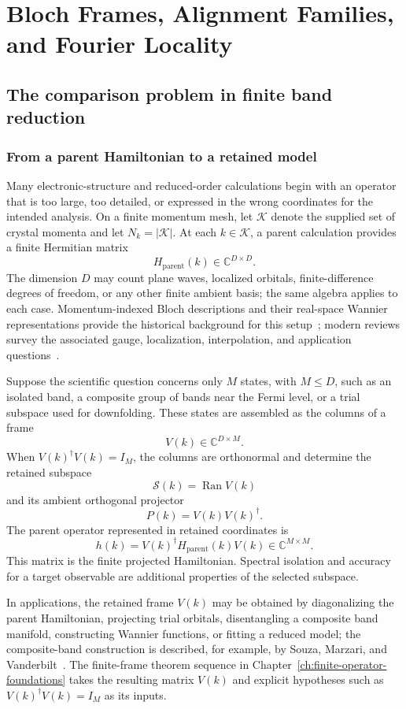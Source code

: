 \chapter{Bloch Frames, Alignment Families, and Fourier Locality}
\label{ch:bloch-alignment-locality}

\section{The comparison problem in finite band reduction}

\subsection{From a parent Hamiltonian to a retained model}

Many electronic-structure and reduced-order calculations begin with an operator that is
too large, too detailed, or expressed in the wrong coordinates for the intended
analysis. On a finite momentum mesh, let $\mathcal K$ denote the supplied set of crystal
momenta and let $N_k=|\mathcal K|$. At each $k\in\mathcal K$, a parent calculation
provides a finite Hermitian matrix
\[
  H_{\mathrm{parent}}(k)\in\mathbb C^{D\times D}.
\]
The dimension $D$ may count plane waves, localized orbitals, finite-difference degrees
of freedom, or any other finite ambient basis; the same algebra applies to each case.
Momentum-indexed Bloch descriptions and their real-space Wannier representations provide
the historical background for this setup~\cite{Bloch1929,Wannier1937}; modern reviews
survey the associated gauge, localization, interpolation, and application
questions~\cite{MarzariEtAl2012}.

Suppose the scientific question concerns only $M$ states, with $M\leq D$, such as an
isolated band, a composite group of bands near the Fermi level, or a trial subspace used
for downfolding. These states are assembled as the columns of a frame
\[
  V(k)\in\mathbb C^{D\times M}.
\]
When $V(k)^\dagger V(k)=I_M$, the columns are orthonormal and determine the retained
subspace
\[
  \mathcal S(k)=\operatorname{Ran}V(k)
\]
and its ambient orthogonal projector
\[
  P(k)=V(k)V(k)^\dagger.
\]
The parent operator represented in retained coordinates is
\[
  h(k)=V(k)^\dagger H_{\mathrm{parent}}(k)V(k)
  \in\mathbb C^{M\times M}.
\]
This matrix is the finite projected Hamiltonian. Spectral isolation and accuracy for a
target observable are additional properties of the selected subspace.

In applications, the retained frame $V(k)$ may be obtained by diagonalizing the parent
Hamiltonian, projecting trial orbitals, disentangling a composite band manifold,
constructing Wannier functions, or fitting a reduced model; the composite-band
construction is described, for example, by Souza, Marzari, and
Vanderbilt~\cite{SouzaMarzariVanderbilt2001}. The finite-frame theorem sequence in
Chapter~\ref{ch:finite-operator-foundations} takes the resulting matrix $V(k)$ and
explicit hypotheses such as $V(k)^\dagger V(k)=I_M$ as its inputs.


